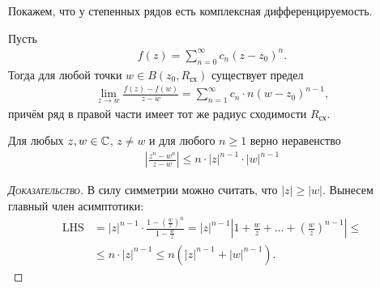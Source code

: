 Покажем, что у степенных рядов есть комплексная дифференцируемость.

\begin{crly}
 \label{corollary:complex_differential_of_}
 Пусть
 \begin{align*}
  f(z) = \sum_{n=0}^{\infty} c_n(z - z_0)^{n}.
 \end{align*} Тогда для любой точки $w \in B(z_0, R_{\text{сх}})$ существует предел
 \begin{align*}
  \lim_{z \to w} \frac{f(z) - f(w)}{z - w} = \sum_{n=1}^{\infty} c_n \cdot n (w - z_0)^{n-1},
 \end{align*} причём ряд в правой части имеет тот же радиус сходимости $R_{\text{сх}}$.
\end{crly}
\begin{lm}
 \label{lemma:complex_n_w_inequality}
 Для любых $z, w \in \mathbb{C}$, $z \neq w$ и для любого $n \geqslant 1$ верно неравенство
 \begin{align*}
  \left|\frac{z^{n} - w^{n}}{z - w} \right| \leqslant n \cdot \left| z \right|^{n-1} \cdot \left| w \right|^{n-1}
 \end{align*} 
\end{lm}
\begin{proof}[\normalfont\textsc{Доказательство}]
 В силу симметрии можно считать, что $\left| z \right| \geqslant \left| w \right|$. Вынесем главный член асимптотики:
 \begin{align*}
  \mathrm{LHS} &= \left| z \right|^{n-1} \cdot \frac{1 - \left( \frac{w}{z} \right)^{n}}{1 - \frac{w}{z}} = \left| z \right|^{n-1} \left| 1 + \frac{w}{z} + \ldots + \left( \frac{w}{z} \right)^{n-1} \right| \leqslant \\
  &\leqslant n \cdot \left| z \right|^{n-1} \leqslant n \left( \left| z \right|^{n-1} + \left| w \right|^{n-1} \right).
 \end{align*} 
\end{proof}
